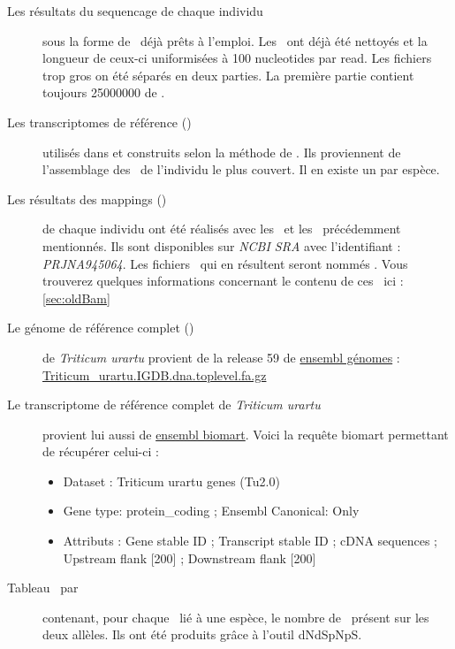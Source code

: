\documentclass[../main]{subfiles} %
\begin{document}
\begin{description}
    \item[Les résultats du \gls{sequencage} de chaque individu] sous la forme de \fastq déjà prêts à l’emploi. Les \reads ont déjà été nettoyés et la longueur de ceux-ci uniformisées à 100 \glspl{nucleotide} par \gls{read}. Les fichiers trop gros on été séparés en deux parties. La première partie contient toujours \num{25 000 000} de \reads.
    
    \item[Les \glspl{transcriptome} de référence (\TrEx)] utilisés dans \cite{glemin_pervasive_2019} et construits selon la méthode de \cite{sarah_large_2017}. Ils proviennent de l'\gls{assemblage} des \reads de l’individu le plus couvert. Il en existe un par espèce. 

    \item[Les résultats des \glspl{mapping} (\OldBam)]  de chaque individu ont été réalisés avec les \fastq et les \TrEx précédemment mentionnés. Ils sont disponibles sur \textit{NCBI SRA} avec l'identifiant : \textit{PRJNA945064}. Les fichiers \bam qui en résultent seront nommés \OldBam. Vous trouverez quelques informations concernant le contenu de ces \bam ici : \cref{sec:oldBam}

    \item[Le génome de référence complet  (\GeMo)] de \textit{Triticum urartu} provient de la release 59 de \href{https://www.ensembl.org}{ensembl génomes} : \href{https://ftp.ebi.ac.uk/ensemblgenomes/pub/release-59/plants/fasta/triticum_urartu/dna/Triticum_urartu.IGDB.dna.toplevel.fa.gz}{Triticum\_urartu.IGDB.dna.toplevel.fa.gz} 

    \item[Le \gls{transcriptome} de référence complet de \textit{Triticum urartu}] provient lui aussi de \href{https://www.ensembl.org}{ensembl biomart}. Voici la requête biomart permettant de récupérer celui-ci :
    \begin{itemize}
        \item Dataset : Triticum urartu genes (Tu2.0)
        \item Gene type: protein\_coding ; Ensembl Canonical: Only
        \item Attributs :  Gene stable ID ; Transcript stable ID ; cDNA sequences ; Upstream flank [200] ; Downstream flank [200]
    \end{itemize}
    
    \item[Tableau \SNP par \contig] contenant, pour chaque \contig lié à une espèce, le nombre de \SNP présent sur les deux  
    allèles. Ils ont été produits grâce à l'outil \gls{dNdSpNpS}.


\end{description}
\end{document}

